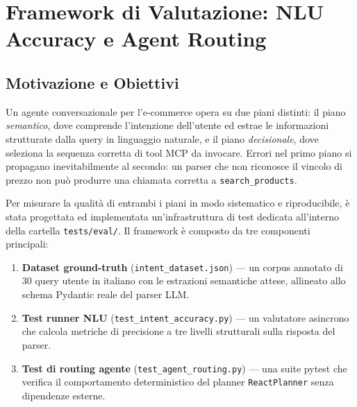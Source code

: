 
\chapter{Framework di Valutazione: NLU Accuracy e Agent Routing}
\label{chap:evaluation}

\section{Motivazione e Obiettivi}
\label{sec:eval-intro}

Un agente conversazionale per l'e-commerce opera su due piani distinti:
il piano \emph{semantico}, dove comprende l'intenzione dell'utente ed
estrae le informazioni strutturate dalla query in linguaggio naturale, e
il piano \emph{decisionale}, dove seleziona la sequenza corretta di tool
MCP da invocare. Errori nel primo piano si propagano inevitabilmente al
secondo: un parser che non riconosce il vincolo di prezzo non può
produrre una chiamata corretta a \texttt{search\_products}.

Per misurare la qualità di entrambi i piani in modo sistematico e
riproducibile, è stata progettata ed implementata un'infrastruttura di
test dedicata all'interno della cartella \texttt{tests/eval/}. Il
framework è composto da tre componenti principali:

\begin{enumerate}
    \item \textbf{Dataset ground-truth} (\texttt{intent\_dataset.json}) —
          un corpus annotato di 30 query utente in italiano con le
          estrazioni semantiche attese, allineato allo schema Pydantic
          reale del parser LLM.
    \item \textbf{Test runner NLU} (\texttt{test\_intent\_accuracy.py}) —
          un valutatore asincrono che calcola metriche di precisione a
          tre livelli strutturali sulla risposta del parser.
    \item \textbf{Test di routing agente} (\texttt{test\_agent\_routing.py}) —
          una suite pytest che verifica il comportamento deterministico
          del planner \texttt{ReactPlanner} senza dipendenze esterne.
\end{enumerate}

